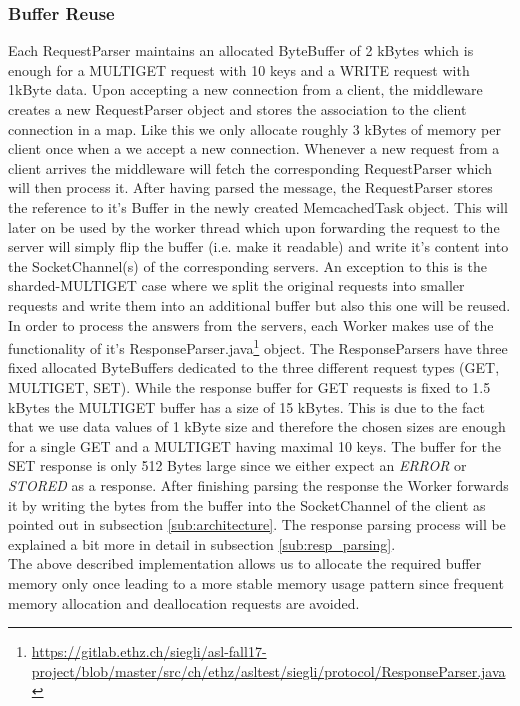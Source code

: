 \documentclass[11pt,a4paper]{article}
\let\ti\textit
\begin{document}
\subsubsection*{Buffer Reuse}
Each RequestParser maintains an allocated ByteBuffer of 2 kBytes which is enough for a MULTIGET request with 10 keys and a WRITE request with 1kByte data. Upon accepting a new connection from a client, the middleware creates a new RequestParser object and stores the association to the client connection in a map. Like this we only allocate roughly 3 kBytes of memory per client once when a we accept a new connection. Whenever a new request from a client arrives the middleware will fetch the corresponding RequestParser which will then process it. After having parsed the message, the RequestParser stores the reference to it's Buffer in the newly created MemcachedTask object. This will later on be used by the worker thread which upon forwarding the request to the server will simply flip the buffer (i.e. make it readable) and write it's content into the SocketChannel(s) of the corresponding servers. An exception to this is the sharded-MULTIGET case where we split the original requests into smaller requests and write them into an additional buffer but also this one will be reused.\\

In order to process the answers from the servers, each Worker makes use of the functionality of it's ResponseParser.java\footnote{\url{https://gitlab.ethz.ch/siegli/asl-fall17-project/blob/master/src/ch/ethz/asltest/siegli/protocol/ResponseParser.java}} object. The ResponseParsers have three fixed allocated ByteBuffers dedicated to the three different request types (GET, MULTIGET, SET). While the response buffer for GET requests is fixed to 1.5 kBytes the MULTIGET buffer has a size of 15 kBytes. This is due to the fact that we use data values of 1 kByte size and therefore the chosen sizes are enough for a single GET and a MULTIGET having maximal 10 keys. The buffer for the SET response is only 512 Bytes large since we either expect an \ti{ERROR} or \ti{STORED} as a response. After finishing parsing the response the Worker forwards it by writing the bytes from the buffer into the SocketChannel of the client as pointed out in subsection \ref{sub:architecture}. The response parsing process will be explained a bit more in detail in subsection \ref{sub:resp_parsing}.\\

The above described implementation allows us to allocate the required buffer memory only once leading to a more stable memory usage pattern since frequent memory allocation and deallocation requests are avoided. 
\end{document}
